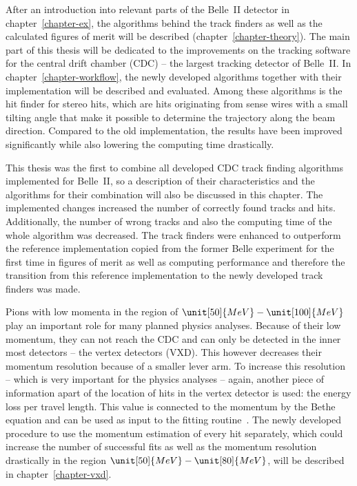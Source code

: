 After an introduction into relevant parts of the Belle~II detector in chapter~\ref{chapter-ex}, the algorithms behind the track finders as well as the calculated figures of merit will be described (chapter~\ref{chapter-theory}). The main part of this thesis will be dedicated to the improvements on the tracking software for the central drift chamber (CDC) -- the largest tracking detector of Belle~II. In chapter~\ref{chapter-workflow}, the newly developed algorithms together with their implementation will be described and evaluated. Among these algorithms is the hit finder for stereo hits, which are hits originating from sense wires with a small tilting angle that make it possible to determine the trajectory along the beam direction. Compared to the old implementation, the results have been improved significantly while also lowering the computing time drastically.

This thesis was the first to combine all developed CDC track finding algorithms implemented for Belle~II, so a description of their characteristics and the algorithms for their combination will also be discussed in this chapter. The implemented changes increased the number of correctly found tracks and hits. Additionally, the number of wrong tracks and also the computing time of the whole algorithm was decreased. The track finders were enhanced to outperform the reference implementation copied from the former Belle experiment for the first time in figures of merit as well as computing performance and therefore the transition from this reference implementation to the newly developed track finders was made.

Pions with low momenta in the region of $\unit[50]{MeV} - \unit[100]{MeV}$ play an important role for many planned physics analyses. Because of their low momentum, they can not reach the CDC and can only be detected in the inner most detectors -- the vertex detectors (VXD). This however decreases their momentum resolution because of a smaller lever arm. To increase this resolution -- which is very important for the physics analyses -- again, another piece of information apart of the location of hits in the vertex detector is used: the energy loss per travel length. This value is connected to the momentum by the Bethe equation and can be used as input to the fitting routine~\cite{robert}. The newly developed procedure to use the momentum estimation of every hit separately, which could increase the number of successful fits as well as the momentum resolution drastically in the region $\unit[50]{MeV} - \unit[80]{MeV}$, will be described in chapter~\ref{chapter-vxd}.


